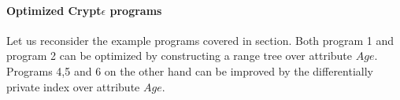 \paragraph*{Optimized Crypt$\epsilon$ programs}
Let us reconsider the example programs covered in section. Both program 1 and program 2 can be optimized by constructing a range tree over attribute $Age$. Programs  4,5 and 6 on the other hand can be improved by the differentially private index over attribute $Age$.
